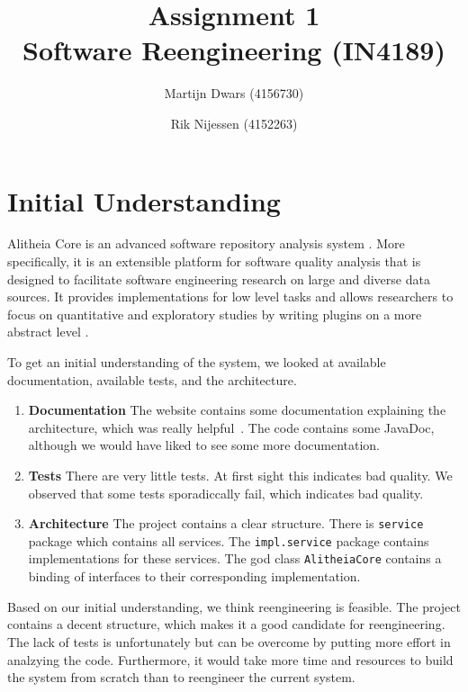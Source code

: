 \documentclass{article}
\author{Martijn Dwars (4156730) \and Rik Nijessen (4152263)}
\title{Assignment 1 \\ Software Reengineering (IN4189)}
\begin{document}
\maketitle

\section{Initial Understanding}
Alitheia Core is an advanced software repository analysis system \cite{sqooss-docs}. More specifically, it is an extensible platform for software quality analysis that is designed to facilitate software engineering research on large and diverse data sources. It provides implementations for low level tasks and allows researchers to focus on quantitative and exploratory studies by writing plugins on a more abstract level \cite{sqooss-about}.

To get an initial understanding of the system, we looked at available documentation, available tests, and the architecture.

\begin{enumerate}
\item \textbf{Documentation} The website contains some documentation explaining the architecture, which was really helpful~\cite{sqooss-reference}. The code contains some JavaDoc, although we would have liked to see some more documentation.

\item \textbf{Tests} There are very little tests. At first sight this indicates bad quality. We observed that some tests sporadiccally fail, which indicates bad quality.

\item \textbf{Architecture} The project contains a clear structure. There is \verb|service| package which contains all services. The \verb|impl.service| package contains implementations for these services. The god class \verb|AlitheiaCore| contains a binding of interfaces to their corresponding implementation.
\end{enumerate}

Based on our initial understanding, we think reengineering is feasible. The project contains a decent structure, which makes it a good candidate for reengineering. The lack of tests is unfortunately but can be overcome by putting more effort in analzying the code. Furthermore, it would take more time and resources to build the system from scratch than to reengineer the current system.
\end{document}

